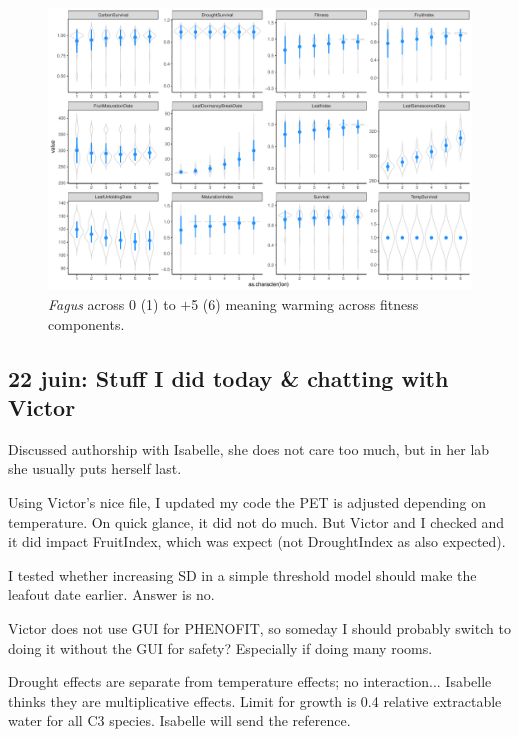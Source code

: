 \documentclass[11pt,letter]{article}
\begin{document}
\begin{figure} 
 \begin{center}
\noindent \includegraphics[width=1\textwidth]{..//analyses/graphs/phenofit/sims/meansim53_allmetricsFS.pdf}
  \caption{\emph{Fagus} across 0 (1) to $+$5 (6) meaning warming across fitness components.}
  \label{fig:fagusmean53}
  \end{center}
\end{figure}

\subsection{22 juin: Stuff I did today \& chatting with Victor}

Discussed authorship with Isabelle, she does not care too much, but in her lab she usually puts herself last. 

Using Victor's nice file, I updated my code the PET is adjusted depending on temperature. On quick glance, it did not do much. But Victor and I checked and it did impact FruitIndex, which was expect (not DroughtIndex as also expected). 

I tested whether increasing SD in a simple threshold model should make the leafout date earlier. Answer is no. 

Victor does not use GUI for PHENOFIT, so someday I should probably switch to doing it without the GUI for safety? Especially if doing many rooms. 

Drought effects are separate from temperature effects; no interaction... Isabelle thinks they are multiplicative effects. Limit for growth is 0.4 relative extractable water for all C3 species. Isabelle will send the reference. 
\end{document}
